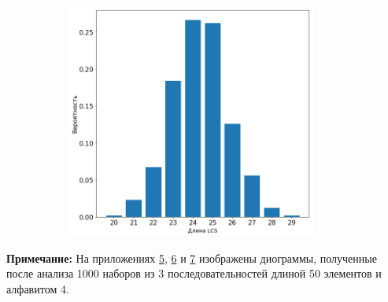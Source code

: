 \documentclass[a4paper,12pt]{extarticle}
\begin{document}
\begin{figure}[h!]
\begin{subfigure}{.5\textwidth}
    \includegraphics[width=0.9\textwidth]{Diogram_3.png}
    \label{fig:3}
  \end{subfigure}
\end{figure}
\textbf{Примечание: } На приложениях \hyperref[fig:1]{5}, \hyperref[fig:2]{6} и \hyperref[fig:3]{7} изображены диограммы, полученные после анализа 1000 наборов из 3 последовательностей длиной 50 элементов и алфавитом 4.
\end{document}
